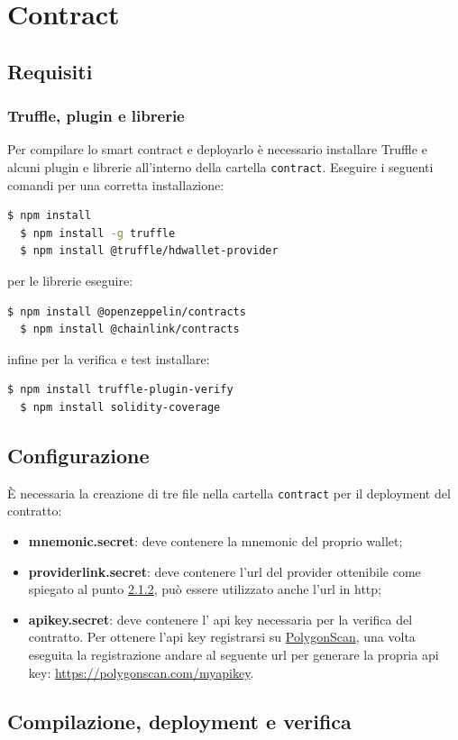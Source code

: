 \documentclass[a4paper, 12pt]{article}
\begin{document}
\section{Contract}
\subsection{Requisiti}
\subsubsection{Truffle, plugin e librerie}
Per compilare lo smart contract e deployarlo è necessario installare Truffle e alcuni plugin e librerie all'interno della cartella \texttt{contract}. Eseguire i seguenti comandi per una corretta installazione:
\begin{lstlisting}[language=bash]
  $ npm install
  $ npm install -g truffle
  $ npm install @truffle/hdwallet-provider
\end{lstlisting}
per le librerie eseguire:
\begin{lstlisting}[language=bash]
  $ npm install @openzeppelin/contracts
  $ npm install @chainlink/contracts
\end{lstlisting}
infine per la verifica e test installare:
\begin{lstlisting}[language=bash]
  $ npm install truffle-plugin-verify
  $ npm install solidity-coverage
\end{lstlisting}
\subsection{Configurazione}
È necessaria la creazione di tre file nella cartella \texttt{contract} per il deployment del contratto:
\begin{itemize}
  \item \textbf{mnemonic.secret}: deve contenere la mnemonic del proprio wallet;
  \item \textbf{providerlink.secret}: deve contenere l'url del provider ottenibile come spiegato al punto \hyperref[sec:provider]{2.1.2}, può essere utilizzato anche l'url in http;
  \item \textbf{apikey.secret}: deve contenere l' api key necessaria per la verifica del contratto. Per ottenere l'api key registrarsi su \href{https://polygonscan.com/}{PolygonScan}, una volta eseguita la registrazione andare al seguente url per generare la propria api key: \url{https://polygonscan.com/myapikey}.
\end{itemize}
\subsection{Compilazione, deployment e verifica}
\end{document}
